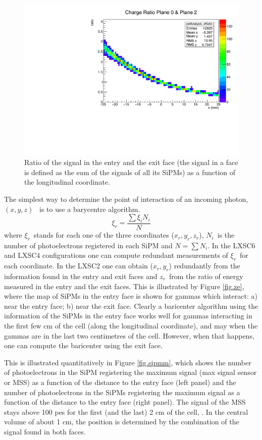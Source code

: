 \documentclass{JINST}
\begin{document}
\begin{figure}[!htb]
	\centering
	\includegraphics[scale=0.7]{img/z_ratio_totalCharge.pdf}
	\caption{\label{fig.zratio}  Ratio of the signal in the entry and the exit face (the signal in a face is defined as the sum of the signals of all its SiPMs) as a function of the longitudinal coordinate.}
\end{figure}

The simplest way to determine the point of interaction of an incoming photon, $(x,y,z)$~ is to use a barycentre algorithm. 
\[
\xi_r = \frac{\sum \xi_i N_i}{N}
\]
where $\xi_r$~stands for each one of the three coordinates ($x_r, y_r, z_r$), $N_i$~is the number of photoelectrons registered in each SiPM and $N=\sum N_i$. In the LXSC6 and LXSC4 configurations one can compute redundant measurements of $\xi_r$~for each coordinate. In the LXSC2 one can obtain ($x_r,y_r$) redundantly from the information found in the entry and exit faces and $z_r$~from the ratio of energy measured in the entry and the exit faces. This is illustrated by Figure \ref{fig.ze}, where the map of SiPMs in the entry face  is shown for gammas which interact: a) near the entry face; b) near the exit face. Clearly a baricenter algorithm using the information of the SiPMs in the entry face works well for gammas interacting in the first few cm of the cell (along the longitudinal coordinate), and may when the gammas are in the last two centimetres of the cell. However, when that happens, one can compute the baricenter using the exit face.  

This is illustrated quantitatively in Figure \ref{fig.sipmm}, which shows the number of photoelectrons in the SiPM registering the maximum signal (max signal sensor or MSS) as a function of the distance to the entry face (left panel) and the number of photoelectrons in the SiPMs registering the maximum signal as a function of the distance to the entry face (right panel). The signal of the MSS stays above 100 pes for the first (and the last) 2 cm of the cell, . In the central volume of about 1 cm, the position is determined by the combination of the signal found in both faces. 
\end{document}
